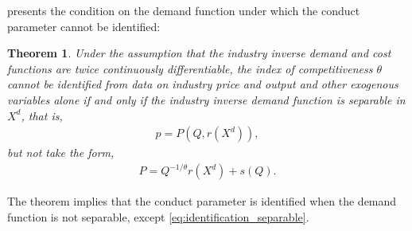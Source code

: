 \documentclass[11pt, a4paper]{article}
\newtheorem{theorem}{Theorem}
\theoremstyle{remark}
\begin{document}
\citet{lau1982identifying} presents the condition on the demand function under which the conduct parameter cannot be identified:
\begin{framed}
\begin{theorem}\label{theorem_lau}
    Under the assumption that the industry inverse demand and cost functions are twice continuously differentiable, the index of competitiveness $\theta$ cannot be identified from data on industry price and output and other exogenous variables alone if and only if the industry inverse demand function is separable in $X^{d}$, that is,
    \begin{align}
        p = P(Q, r(X^{d})), \label{eq:demand_separable}
    \end{align}
    but not take the form, 
    \begin{align}
        P = Q^{-1/\theta}r(X^{d}) + s(Q). \label{eq:identification_separable}
    \end{align}
\end{theorem}
\end{framed}
The theorem implies that the conduct parameter is identified when the demand function is not separable, except \eqref{eq:identification_separable}.

\end{document}
